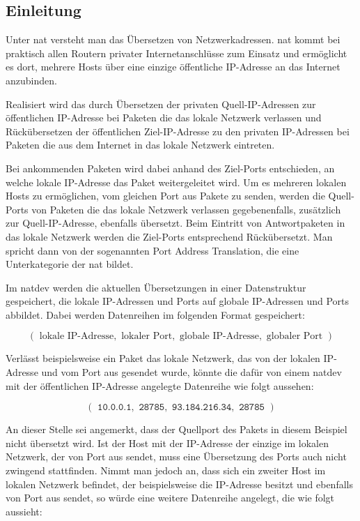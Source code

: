 
\label{dcl-natt}

\subsection{Einleitung}
Unter \gls{nat} versteht man das Übersetzen von Netzwerkadressen.
\Gls{nat} kommt bei praktisch allen Routern privater Internetanschlüsse zum
Einsatz und ermöglicht es dort, mehrere Hosts über eine einzige öffentliche
IP-Adresse an das Internet anzubinden.

Realisiert wird das durch Übersetzen der privaten Quell-IP-Adressen zur
öffentlichen IP-Adresse bei Paketen die das lokale Netzwerk verlassen und
Rückübersetzen der öffentlichen Ziel-IP-Adresse zu den privaten IP-Adressen
bei Paketen die aus dem Internet in das lokale Netzwerk eintreten.

Bei ankommenden Paketen wird dabei anhand des Ziel-Ports entschieden, an welche
lokale IP-Adresse das Paket weitergeleitet wird.
Um es mehreren lokalen Hosts zu ermöglichen, vom gleichen Port aus Pakete zu
senden, werden die Quell-Ports von Paketen die das lokale Netzwerk verlassen
gegebenenfalls, zusätzlich zur Quell-IP-Adresse, ebenfalls übersetzt.
Beim Eintritt von Antwortpaketen in das lokale Netzwerk werden die Ziel-Ports
entsprechend Rückübersetzt. Man spricht dann von der sogenannten Port Address
Translation, die eine Unterkategorie der \acrlong{nat} bildet.

Im \gls{natdev} werden die aktuellen Übersetzungen in einer Datenstruktur
gespeichert, die lokale IP-Adressen und Ports auf globale IP-Adressen und Ports
abbildet.
Dabei werden Datenreihen im folgenden Format gespeichert:

\begin{equation*}
    (\text{ lokale IP-Adresse}, \text{ lokaler Port}, \text{ globale IP-Adresse}, \text{ globaler Port })
\end{equation*}

Verlässt beispielsweise ein Paket das lokale Netzwerk, das von der lokalen
IP-Adresse  und vom Port  aus gesendet wurde,
könnte die dafür von einem \gls{natdev} mit der öffentlichen IP-Adresse
 angelegte Datenreihe wie folgt aussehen:

\begin{equation*}
    (\texttt{ 10.0.0.1}, \texttt{ 28785}, \texttt{ 93.184.216.34}, \texttt{ 28785 })
\end{equation*}

An dieser Stelle sei angemerkt, dass der Quellport des Pakets in diesem Beispiel
nicht übersetzt wird.
Ist der Host mit der IP-Adresse  der einzige im lokalen Netzwerk,
der von Port  aus sendet, muss eine Übersetzung des Ports auch nicht
zwingend stattfinden.
Nimmt man jedoch an, dass sich ein zweiter Host im lokalen Netzwerk befindet,
der beispielsweise die IP-Adresse  besitzt und ebenfalls von Port
 aus sendet, so würde eine weitere Datenreihe angelegt, die wie
folgt aussieht:

